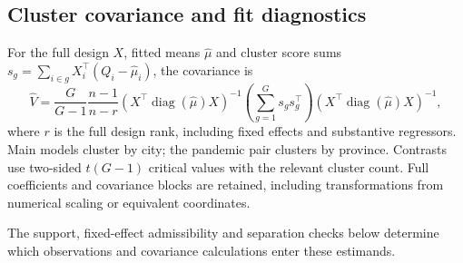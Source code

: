 \subsection{Cluster covariance and fit diagnostics}
For the full design $X$, fitted means $\widehat\mu$ and cluster score sums
$s_g=\sum_{i\in g}X_i^{\top}(Q_i-\widehat\mu_i)$, the covariance is
\begin{equation}
 \widehat V=\frac{G}{G-1}\frac{n-1}{n-r}
 (X^{\top}\operatorname{diag}(\widehat\mu)X)^{-1}
 \left(\sum_{g=1}^{G}s_gs_g^{\top}\right)
 (X^{\top}\operatorname{diag}(\widehat\mu)X)^{-1},
\end{equation}
where $r$ is the full design rank, including fixed effects and substantive
regressors.  Main models cluster by city; the pandemic pair clusters by
province.  Contrasts use two-sided $t(G-1)$ critical values with the relevant
cluster count.  Full coefficients and covariance blocks are retained,
including transformations from numerical scaling or equivalent coordinates.

The support, fixed-effect admissibility and separation checks below determine
which observations and covariance calculations enter these estimands.


